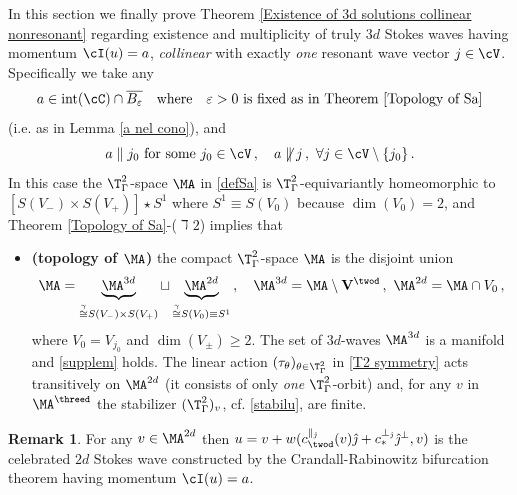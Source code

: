\documentclass[11pt,a4paper,reqno]{article}
\DeclareMathOperator{\interior}{int}
\numberwithin{equation}{section}
\theoremstyle{definition}
\newtheorem{remark}[theorem]{Remark}
\begin{document}
In this section we finally prove Theorem \ref{Existence of 3d solutions collinear nonresonant} regarding 
existence and multiplicity of truly $ 3d $ Stokes waves 
having  
momentum 
    $    \cI (u) = a$, 
   {\it collinear} with exactly {\it one} resonant wave vector $j\in \cV$. Specifically 
   we take any 
   \begin{equation} \label{comeprendoa}  
   a\in  \interior(\cC) \cap \overline{B_\varepsilon} 
   \quad \text{where} \quad   
   \varepsilon>0 \
\text{is fixed as in Theorem }  \ref{Topology of Sa} 
   \end{equation} 
 (i.e. as in Lemma 
 \ref{a nel cono}), and
\begin{equation} \label{comeprendoa1}
a \parallel j_0 \ \text{for some} \ j_0 \in \cV \, , \quad 
a \not \parallel j \, , \ \forall  j \in \cV \setminus \{ j_0  \} \, . 
\end{equation}
In this case 
the $\T^2_\Gamma$-space 
   $\MA$ in 
\eqref{defSa} is $\T^2_\Gamma$-equivariantly homeomorphic to
    $[S(V_-)\times S(V_+)] \star S^1$
    where $ S^1 \equiv S(V_0)   $ because 
    $ \dim (V_0 ) = 2 $,  
and  Theorem 
\ref{Topology of Sa}-($\daleth 2$) implies that
\begin{itemize}
\item {\bf (topology of $\MA $)}
the compact $ \T^2_\Gamma$-space $\MA $ is the disjoint union 
\begin{equation}\label{MaS1}
    \MA = 
\underbrace{\MA^{3d}}_{\stackrel{\gamma} \cong 
S(V_-) \times S(V_+)} \sqcup \underbrace{\MA^{2d}}_{\stackrel{\gamma} 
\cong 
S(V_0) \equiv S^1} \, ,\quad \MA^{3d} = \MA \setminus {\bf V}^{\twod} \, ,   
\ \MA^{2d} =  \MA \cap V_0  \, ,
\end{equation}
where  $ V_0 = V_{j_0} $ and 
$  \dim (V_\pm) \geq 2 $. 
The set  of $ 3d$-waves 
$ \MA^{3d}  $ is a manifold  
and \eqref{supplem} holds.
The linear action $ (\tau_\theta )_{\theta \in \T^2_\Gamma}$ in \eqref{T2 symmetry} 
acts transitively 
on  $ \MA^{2d} $ (it 
consists of only {\it one} 
$ \T^2_\Gamma $-orbit) and, for any
$ v $ in $ \MA^{\threed} $ 
the  stabilizer  $ (\T_\Gamma^2)_v $, cf. \eqref{stabilu}, are finite. 
\end{itemize}

\begin{remark}\label{sonosta}
 For any $ v \in \MA^{2d} $ then $ u = v + w(c_{\twod}^{\parallel_{\hat \jmath}}(v)\hat \jmath+c_*^{\bot_{\hat \jmath}}\hat \jmath^{\bot},v) $  is the celebrated $ 2d $ Stokes wave   constructed  by the Crandall-Rabinowitz bifurcation theorem having momentum $ \cI (u) = a $. 
\end{remark}
\end{document}
